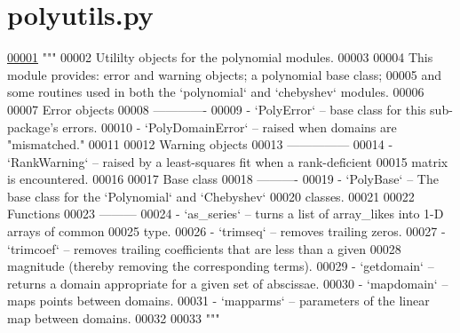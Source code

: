 \hypertarget{polyutils_8py_source}{}\section{polyutils.\+py}
\label{polyutils_8py_source}

\begin{DoxyCode}
\hypertarget{polyutils_8py_source_l00001}{}\hyperlink{namespacepyneb_1_1utils_1_1polyutils}{00001} \textcolor{stringliteral}{"""}
00002 \textcolor{stringliteral}{Utililty objects for the polynomial modules.}
00003 \textcolor{stringliteral}{}
00004 \textcolor{stringliteral}{This module provides: error and warning objects; a polynomial base class;}
00005 \textcolor{stringliteral}{and some routines used in both the `polynomial` and `chebyshev` modules.}
00006 \textcolor{stringliteral}{}
00007 \textcolor{stringliteral}{Error objects}
00008 \textcolor{stringliteral}{-------------}
00009 \textcolor{stringliteral}{- `PolyError` -- base class for this sub-package's errors.}
00010 \textcolor{stringliteral}{- `PolyDomainError` -- raised when domains are "mismatched."}
00011 \textcolor{stringliteral}{}
00012 \textcolor{stringliteral}{Warning objects}
00013 \textcolor{stringliteral}{---------------}
00014 \textcolor{stringliteral}{- `RankWarning` -- raised by a least-squares fit when a rank-deficient}
00015 \textcolor{stringliteral}{  matrix is encountered.}
00016 \textcolor{stringliteral}{}
00017 \textcolor{stringliteral}{Base class}
00018 \textcolor{stringliteral}{----------}
00019 \textcolor{stringliteral}{- `PolyBase` -- The base class for the `Polynomial` and `Chebyshev`}
00020 \textcolor{stringliteral}{  classes.}
00021 \textcolor{stringliteral}{}
00022 \textcolor{stringliteral}{Functions}
00023 \textcolor{stringliteral}{---------}
00024 \textcolor{stringliteral}{- `as\_series` -- turns a list of array\_likes into 1-D arrays of common}
00025 \textcolor{stringliteral}{  type.}
00026 \textcolor{stringliteral}{- `trimseq` -- removes trailing zeros.}
00027 \textcolor{stringliteral}{- `trimcoef` -- removes trailing coefficients that are less than a given}
00028 \textcolor{stringliteral}{  magnitude (thereby removing the corresponding terms).}
00029 \textcolor{stringliteral}{- `getdomain` -- returns a domain appropriate for a given set of abscissae.}
00030 \textcolor{stringliteral}{- `mapdomain` -- maps points between domains.}
00031 \textcolor{stringliteral}{- `mapparms` -- parameters of the linear map between domains.}
00032 \textcolor{stringliteral}{}
00033 \textcolor{stringliteral}{"""}

\end{DoxyCode}
